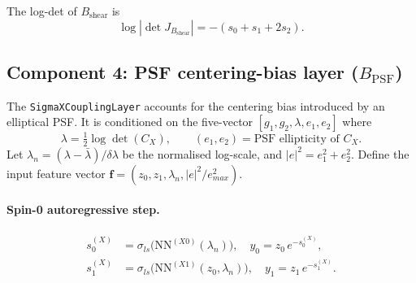 The log-det of $B_{\mathrm{shear}}$ is
\begin{equation}
  \log|\det J_{B_{\mathrm{shear}}}| = -(s_0+s_1+2s_2).
\end{equation}

\subsection*{Component 4: PSF centering-bias layer ($B_{\mathrm{PSF}}$)}

The \texttt{SigmaXCouplingLayer} accounts for the centering bias introduced
by an elliptical PSF.  It is conditioned on the five-vector
$[g_1,g_2,\lambda,e_1,e_2]$ where
\begin{equation}
  \lambda = \tfrac{1}{2}\log\det(C_X),\qquad
  (e_1,e_2) = \text{PSF ellipticity of }C_X.
\end{equation}
Let $\lambda_n=(\lambda-\bar\lambda)/\delta\lambda$ be the normalised log-scale,
and $|e|^2=e_1^2+e_2^2$.  Define the input feature vector
$\mathbf{f}=(z_0,z_1,\lambda_n,|e|^2/e_{max}^2)$.

\paragraph{Spin-0 autoregressive step.}
\begin{align}
  s_0^{(X)} &= \sigma_{ls}\!\bigl(\mathrm{NN}^{(X0)}(\lambda_n)\bigr),\quad
  y_0 = z_0\,e^{-s_0^{(X)}},\label{eq:sx_0}\\
  s_1^{(X)} &= \sigma_{ls}\!\bigl(\mathrm{NN}^{(X1)}(z_0,\lambda_n)\bigr),\quad
  y_1 = z_1\,e^{-s_1^{(X)}}.\label{eq:sx_1}
\end{align}

